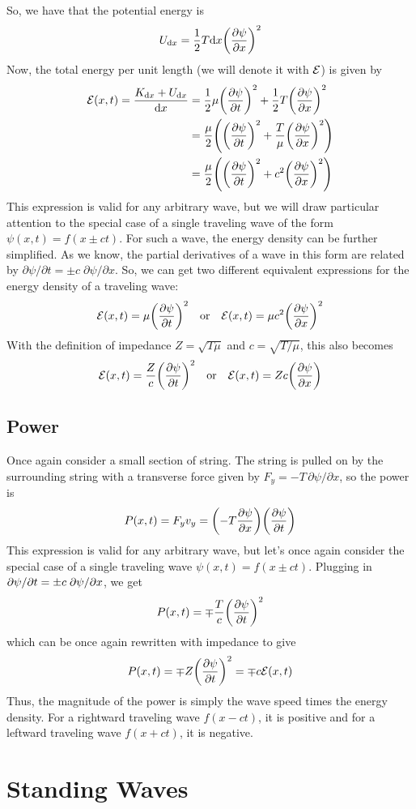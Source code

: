 So, we have that the potential energy is 
\[ U_{\dd x} = \frac{1}{2}T\dd x \pqty{\pdv{\psi}{x}}^2\]
Now, the total energy per unit length (we will denote it with $\mathcal{E}$) is given by
\begin{align*}
    \mcl E(x,t) = \frac{K_{\dd x} + U_{\dd x}}{\dd x} &= \frac{1}{2}\mu \pqty{\pdv{\psi}{t}}^2 + \frac{1}{2}T\pqty{\pdv{\psi}{x}}^2 \\
    &= \frac{\mu}{2} \pqty{\pqty{\pdv{\psi}{t}}^2 + \frac{T}{\mu}\pqty{\pdv{\psi}{x}}^2} \\
    &= \frac{\mu}{2} \pqty{\pqty{\pdv{\psi}{t}}^2 + c^2\pqty{\pdv{\psi}{x}}^2}
\end{align*}
This expression is valid for any arbitrary wave, but we will draw particular attention to the special case of a single traveling wave of the form $\psi(x,t) = f(x\pm ct)$. For such a wave, the energy density can be further simplified. As we know, the partial derivatives of a wave in this form are related by $\partial \psi/\partial t = \pm c\; \partial \psi/\partial x$. So, we can get two different equivalent expressions for the energy density of a traveling wave:
\begin{align*}
    \mcl E(x,t) = \mu \pqty{\pdv{\psi}{t}}^2 \quad\text{or}\quad \mcl E(x,t) = \mu c^2 \pqty{\pdv{\psi}{x}}^2
\end{align*}
With the definition of impedance $Z = \sqrt{T\mu}$ and $c=\sqrt{T/\mu}$, this also becomes
\[ \mcl E(x,t) = \frac{Z}{c} \pqty{\pdv{\psi}{t}}^2 \quad\text{or}\quad \mcl E(x,t) = Zc\pqty{\pdv{\psi}{x}} \]
\subsection*{Power}
Once again consider a small section of string. The string is pulled on by the surrounding string with a transverse force given by $F_y = -T \, \partial \psi/\partial x$, so the power is 
\[ P(x,t) = F_y v_y = \pqty{-T\pdv{\psi}{x}}\pqty{\pdv{\psi}{t}}\]
This expression is valid for any arbitrary wave, but let's once again consider the special case of a single traveling wave $\psi(x,t) = f(x \pm ct)$. Plugging in $\partial \psi/\partial t = \pm c\;\partial \psi/\partial x$, we get
\[ P(x,t) = \mp \frac{T}{c} \pqty{\pdv{\psi}{t}}^2\]
which can be once again rewritten with impedance to give
\[ P(x,t) = \mp Z \pqty{\pdv{\psi}{t}}^2 = \mp c\mcl E(x,t)\]
Thus, the magnitude of the power is simply the wave speed times the energy density. For a rightward traveling wave $f(x-ct)$, it is positive and for a leftward traveling wave $f(x+ct)$, it is negative. 
\section{Standing Waves}
